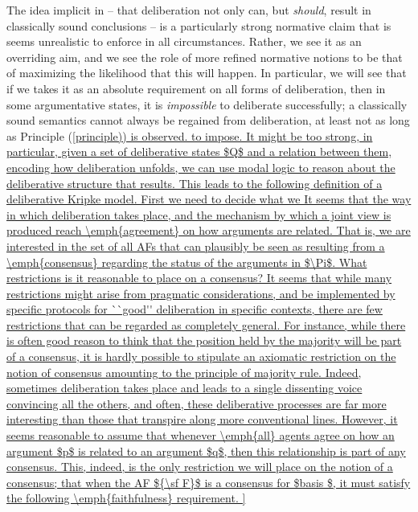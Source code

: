 \documentclass{article}
\newcommand{\af}{{\sf F}}
\newcommand{\basis}{basis }
\begin{document}
The idea implicit in \cite{whyreason} -- that deliberation not only can, but \emph{should}, result in classically sound conclusions -- is a particularly strong normative claim that is seems unrealistic to enforce in all circumstances. Rather, we see it as an overriding aim, and we see the role of more refined normative notions to be that of maximizing the likelihood that this will happen. In particular, we will see that if we takes it as an absolute requirement on all forms of deliberation, then in some argumentative states, it is \emph{impossible} to deliberate successfully; a classically sound semantics cannot always be regained from deliberation, at least not as long as Principle (\ref{principle)) is observed.


to impose. It might be too strong, in particular, 

given a set of deliberative states $Q$ and a relation between them, encoding how deliberation unfolds, we can use modal logic to reason about the deliberative structure that results. This leads to the following definition of a deliberative Kripke model.



First we need to decide what we 
 It seems that the way in which deliberation takes place, and the mechanism by which a joint view is produced

 reach \emph{agreement} on how arguments are related. That is, we are interested in the set of all AFs that can plausibly be seen as resulting from a \emph{consensus} regarding the status of the arguments in $\Pi$. What restrictions is it reasonable to place on a consensus? It seems that while many restrictions might arise from pragmatic considerations, and be implemented by specific protocols for ``good'' deliberation in specific contexts, there are few restrictions that can be regarded as completely general. For instance, while there is often good reason to think that the position held by the majority will be part of a consensus, it is hardly possible to stipulate an axiomatic restriction on the notion of consensus amounting to the principle of majority rule. Indeed, sometimes deliberation takes place and leads to a single dissenting voice convincing all the others, and often, these deliberative processes are far more interesting than those that transpire along more conventional lines. However, it seems reasonable to assume that whenever \emph{all} agents agree on how an argument $p$ is related to an argument $q$, then this relationship is part of any consensus. This, indeed, is the only restriction we will place on the notion of a consensus; that when the AF $\af$ is a consensus for $\basis$, it must satisfy the following \emph{faithfulness} requirement.

}
\end{document}
